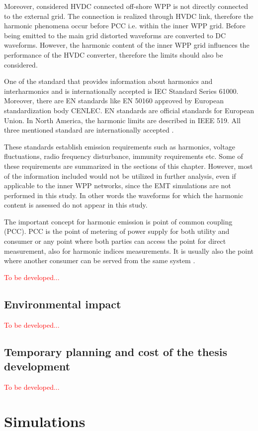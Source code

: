 \documentclass[12pt]{report} %
\begin{document}
Moreover, considered HVDC connected off-shore WPP is not directly connected to the external grid. The connection is realized through HVDC link, therefore the harmonic phenomena occur before PCC i.e. within the inner WPP grid. Before being emitted to the main grid distorted waveforms are converted to DC waveforms. However, the harmonic content of the inner WPP grid influences the performance of the HVDC converter, therefore the limits should also be considered.

One of the standard that provides information about harmonics and interharmonics and is internationally accepted is \cite{iec61000} IEC Standard Series 61000. Moreover, there are EN standards like \cite{en50160} EN 50160 approved by European standardization body CENLEC. EN standards are official standards for European Union. In North America, the harmonic limits are described in \cite{ieee519} IEEE 519. All three mentioned standard are internationally accepted \cite{das}.

These standards establish emission requirements such as harmonics, voltage fluctuations, radio frequency disturbance, immunity requirements etc. Some of these requirements are summarized in the sections of this chapter. However, most of the information included would not be utilized in further analysis, even if applicable to the inner WPP networks, since the EMT simulations are not performed in this study. In other words the waveforms for which the harmonic content is assessed do not appear in this study.

The important concept for harmonic emission is point of common coupling (PCC). PCC is the point of metering of power supply for both utility and consumer or any point where both parties can access the point for direct measurement, also for harmonic indices measurements. It is usually also the point where another consumer can be served from the same system \cite{das}.

\textcolor{red}{To be developed...}

\section{Environmental impact}
\textcolor{red}{To be developed...}
\section{Temporary planning and cost of the thesis development}
\textcolor{red}{To be developed...}

\chapter{Simulations} \label{ch2}
\end{document}
